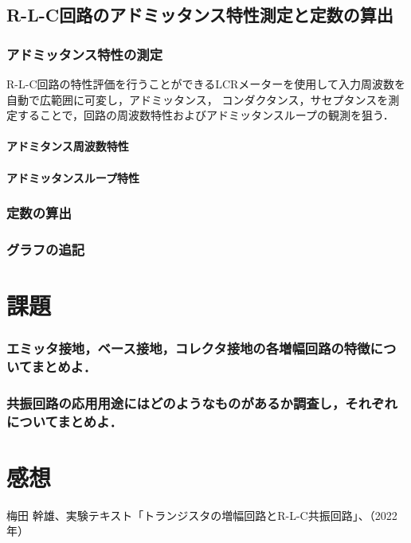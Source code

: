 \documentclass[dvipdfmx,titlepage,a4j]{jsarticle}  %
\numberwithin{equation}{section}
\begin{document}
\subsection{R-L-C回路のアドミッタンス特性測定と定数の算出}

\subsubsection{アドミッタンス特性の測定}
R-L-C回路の特性評価を行うことができるLCRメーターを使用して入力周波数を自動で広範囲に可変し，アドミッタンス，
コンダクタンス，サセプタンスを測定することで，回路の周波数特性およびアドミッタンスループの観測を狙う．

\paragraph{アドミタンス周波数特性}

\paragraph{アドミッタンスループ特性}

\subsubsection{定数の算出}

\subsubsection{グラフの追記}

\section{課題}

\subsubsection{エミッタ接地，ベース接地，コレクタ接地の各増幅回路の特徴についてまとめよ．}

\subsubsection{共振回路の応用用途にはどのようなものがあるか調査し，それぞれについてまとめよ．}

\section{感想}

\begin{thebibliography}{99}
   梅田 幹雄、実験テキスト「トランジスタの増幅回路とR-L-C共振回路」、（2022年）
\end{thebibliography}
\end{document}
